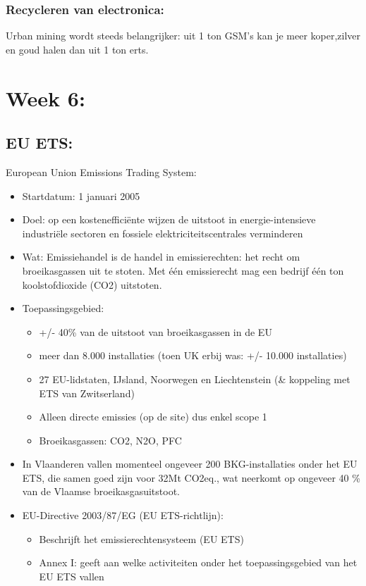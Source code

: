 \documentclass[12pt]{article}
\begin{document}
\subsubsection{Recycleren van electronica:}
Urban mining wordt steeds belangrijker: uit 1 ton GSM's kan je meer koper,zilver en goud halen dan uit 1 ton erts.
\section{Week 6:}
\subsection{EU ETS:}
European Union Emissions Trading System:\begin{itemize}
    \item Startdatum: 1 januari 2005 
    \item Doel: op een kostenefficiënte wijzen de uitstoot in energie-intensieve industriële sectoren en
    fossiele elektriciteitscentrales verminderen
    \item Wat: Emissiehandel is de handel in emissierechten: het recht om broeikasgassen uit te stoten. Met één emissierecht mag een bedrijf één ton koolstofdioxide (CO2) uitstoten.
    \item Toepassingsgebied:\begin{itemize}
        \item +/- 40\% van de uitstoot van broeikasgassen in de EU
        \item meer dan 8.000 installaties (toen UK erbij was: +/- 10.000 installaties) 
        \item 27 EU-lidstaten, IJsland, Noorwegen en Liechtenstein (\& koppeling met ETS van Zwitserland) 
        \item Alleen directe emissies (op de site) dus enkel scope 1 
        \item Broeikasgassen: CO2, N2O, PFC 
    \end{itemize}
    \item In Vlaanderen vallen momenteel ongeveer 200 BKG-installaties onder het EU ETS, die samen goed zijn voor 32Mt CO2eq., wat neerkomt op ongeveer 40 \% van de Vlaamse broeikasgasuitstoot.
    \item EU-Directive 2003/87/EG (EU ETS-richtlijn):\begin{itemize}
        \item Beschrijft het emissierechtensysteem (EU ETS)
        \item Annex I: geeft aan welke activiteiten onder het toepassingsgebied van het EU ETS vallen 

\end{itemize}
\end{itemize}
\end{document}
